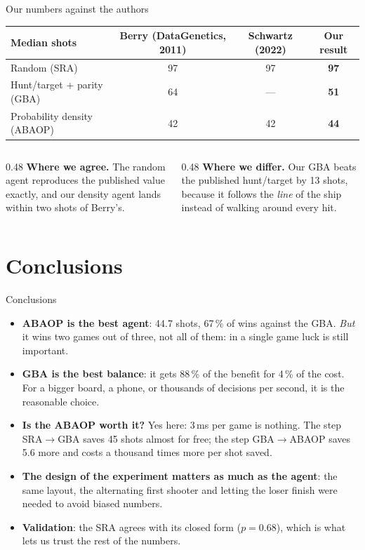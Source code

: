 \documentclass[aspectratio=169,11pt]{beamer}
\begin{document}
\begin{frame}{Our numbers against the authors}
\centering
\begin{tabular}{@{}lccc@{}}
\toprule
Median shots & Berry (DataGenetics, 2011) & Schwartz (2022) & \textbf{Our result} \\
\midrule
Random (SRA)          & 97 & 97 & \textbf{97} \\
Hunt/target + parity (GBA) & 64 & --- & \textbf{51} \\
Probability density (ABAOP) & 42 & 42 & \textbf{44} \\
\bottomrule
\end{tabular}
\vspace{4mm}

\begin{columns}[T]
\begin{column}{0.48\textwidth}
\small\textbf{Where we agree.} The random agent reproduces the published value exactly, and our density agent lands within two shots of Berry's.
\end{column}
\begin{column}{0.48\textwidth}
\small\textbf{Where we differ.} Our GBA beats the published hunt/target by \alert{13 shots}, because it follows the \emph{line} of the ship instead of walking around every hit.
\end{column}
\end{columns}
\end{frame}

\section{Conclusions}

\begin{frame}{Conclusions}
\small
\begin{itemize}\itemsep3pt
    \item \textbf{ABAOP is the best agent}: 44.7 shots, 67\,\% of wins against the GBA. \emph{But} it wins two games out of three, not all of them: in a single game luck is still important.
    \item \textbf{GBA is the best balance}: it gets 88\,\% of the benefit for 4\,\% of the cost. For a bigger board, a phone, or thousands of decisions per second, it is the reasonable choice.
    \item \textbf{Is the ABAOP worth it?} Yes here: 3\,ms per game is nothing. The step SRA$\to$GBA saves 45 shots almost for free; the step GBA$\to$ABAOP saves 5.6 more and costs a thousand times more per shot saved.
    \item \textbf{The design of the experiment matters as much as the agent}: the same layout, the alternating first shooter and letting the loser finish were needed to avoid biased numbers.
    \item \textbf{Validation}: the SRA agrees with its closed form ($p=0.68$), which is what lets us trust the rest of the numbers.
\end{itemize}
\end{frame}
\end{document}
